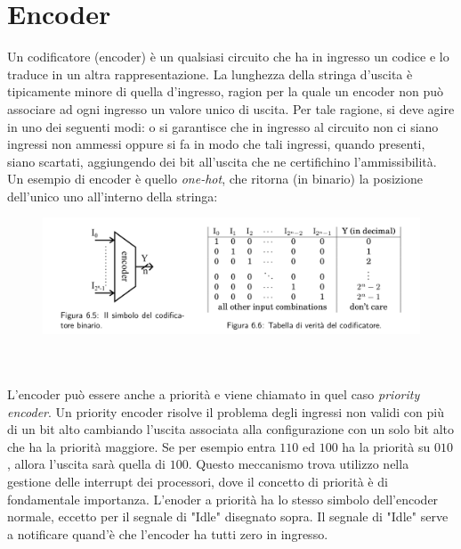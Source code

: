 \documentclass{book}
\begin{document}
    \section{Encoder}
        Un codificatore (encoder) è un qualsiasi circuito che ha in ingresso un codice e lo traduce in un altra rappresentazione. La lunghezza della stringa d'uscita è tipicamente minore di quella d'ingresso, ragion per la quale un encoder non può associare ad ogni ingresso un valore unico di uscita. Per tale ragione, si deve agire in uno dei seguenti modi: o si garantisce che in ingresso al circuito non ci siano ingressi non ammessi oppure si fa in modo che tali ingressi, quando presenti, siano scartati, aggiungendo dei bit all'uscita che ne certifichino l'ammissibilità.\\
        Un esempio di encoder è quello \textit{one-hot}, che ritorna (in binario) la posizione dell'unico uno all'interno della stringa:
        \begin{figure}[h!]
            \centering
            \includegraphics[width=0.75\linewidth]{img/chap6img3.png}
        \end{figure} \\ \\
        L'encoder può essere anche a priorità e viene chiamato in quel caso \textit{priority encoder}. Un priority encoder risolve il problema degli ingressi non validi con più di un bit alto cambiando l'uscita associata alla configurazione con un solo bit alto che ha la priorità maggiore. Se per esempio entra $110$ ed $100$ ha la priorità su $010$, allora l'uscita sarà quella di $100$. Questo meccanismo trova utilizzo nella gestione delle interrupt dei processori, dove il concetto di priorità è di fondamentale importanza. L'enoder a priorità ha lo stesso simbolo dell'encoder normale, eccetto per il segnale di "Idle" disegnato sopra. Il segnale di "Idle" serve a notificare quand'è che l'encoder ha tutti zero in ingresso.
\end{document}
